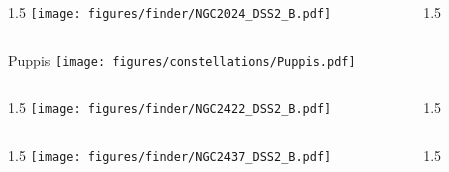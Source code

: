 \documentclass[final]{beamer}
\newlength{\colwidth}
\begin{document}

\begin{frame}[t]{}
  \begin{columns}[T]
    \begin{column}{1.5\colwidth}
      \centering
      \texttt{[image: figures/finder/NGC2024\_DSS2\_B.pdf]}
    \end{column}
    \begin{column}{1.5\colwidth}
      \Large
      
    \end{column}
  \end{columns}
  \vspace{\fill}
\end{frame}


\begin{frame}[t]{\LARGE Puppis}
  \centering
  \texttt{[image: figures/constellations/Puppis.pdf]}
\end{frame}


\begin{frame}[t]{}
  \begin{columns}[T]
    \begin{column}{1.5\colwidth}
      \centering
      \texttt{[image: figures/finder/NGC2422\_DSS2\_B.pdf]}
    \end{column}
    \begin{column}{1.5\colwidth}
      \Large
      
    \end{column}
  \end{columns}
  \vspace{\fill}
  \begin{columns}[T]
    \begin{column}{1.5\colwidth}
      \centering
      \texttt{[image: figures/finder/NGC2437\_DSS2\_B.pdf]}
    \end{column}
    \begin{column}{1.5\colwidth}
      \Large
      
    \end{column}
  \end{columns}
\end{frame}
\end{document}
